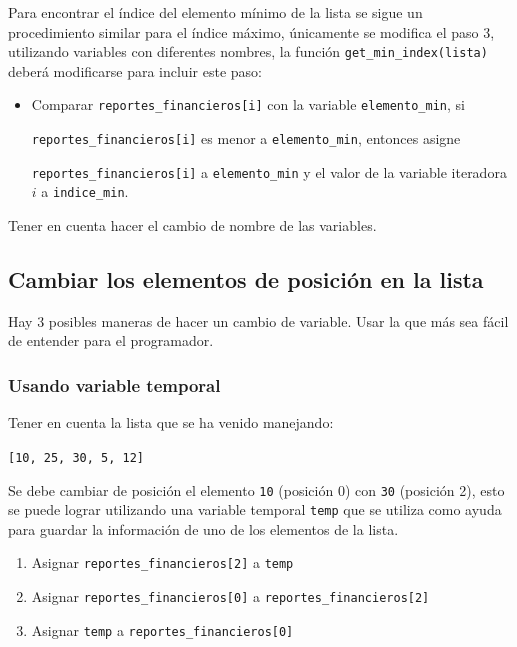 \documentclass{article}
\begin{document}
Para encontrar el índice del elemento mínimo de la lista se sigue un procedimiento similar para el índice máximo, únicamente se modifica el paso 3, utilizando variables con diferentes nombres, la función \texttt{get\_min\_index(lista)} deberá modificarse para incluir este paso:

\begin{itemize}
  \item Comparar \texttt{reportes\_financieros[i]} con la variable
        \texttt{elemento\_min}, si

        \texttt{reportes\_financieros[i]} es menor a \texttt{elemento\_min}, entonces asigne

        \texttt{reportes\_financieros[i]} a \texttt{elemento\_min} y el valor de la variable iteradora \(i\) a \texttt{indice\_min}.
\end{itemize}

Tener en cuenta hacer el cambio de nombre de las variables. 

\subsection{Cambiar los elementos de posición en la lista}
\label{sec:swap}

Hay 3 posibles maneras de hacer un cambio de variable. Usar la que más sea fácil de entender para el programador.

\subsubsection{Usando variable temporal}

Tener en cuenta la lista que se ha venido manejando:

\texttt{[10, 25, 30, 5, 12]}

Se debe cambiar de posición el elemento \texttt{10} (posición 0) con \texttt{30} (posición 2), esto se puede lograr utilizando una variable temporal \texttt{temp} que se utiliza como ayuda para guardar la información de uno de los elementos de la lista.

\begin{enumerate}
  \item Asignar \texttt{reportes\_financieros[2]} a \texttt{temp}
  \item Asignar \texttt{reportes\_financieros[0]} a \texttt{reportes\_financieros[2]}
  \item Asignar \texttt{temp} a \texttt{reportes\_financieros[0]}
\end{enumerate}
\end{document}
